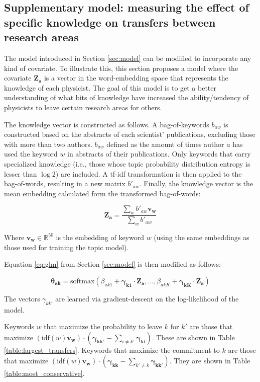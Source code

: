 \documentclass{article}
\begin{document}
\subsection{\label{appendix:knowledge}Supplementary model: measuring the effect of specific knowledge on transfers between research areas}

The model introduced in Section \ref{sec:model} can be modified to incorporate any kind of covariate. To illustrate this, this section proposes a model where the covariate $\bm{Z_a}$ is a vector in the word-embedding space that represents the knowledge of each physicist. The goal of this model is to get a better understanding of what bits of knowledge have increased the ability/tendency of physicists to leave certain research areas for others. 

The knowledge vector is constructed as follows. A bag-of-keywords $b_{aw}$ is constructed based on the abstracts of each scientist' publications, excluding those with more than two authors. $b_{aw}$ defined as the amount of times author $a$ has used the keyword $w$ in abstracts of their publications. Only keywords that carry specialized knowledge (i.e., those whose topic probability distribution entropy is lesser than $\log 2$) are included. A tf-idf transformation is then applied to the bag-of-words, resulting in a new matrix $b'_{aw}$. Finally, the knowledge vector is the mean embedding calculated form the transformed bag-of-words:

\begin{equation}
    \bm{Z_{a}} = \dfrac{\sum_w b'_{aw} \bm{v_{w}}}{\sum_w b'_{aw}} 
\end{equation}

Where $\bm{v_w}\in\mathbb{R}^{50}$ is the embedding of keyword $w$ (using the same embeddings as those used for training the topic model). 

Equation \eqref{eq:glm} from Section \ref{sec:model} is then modified as follows:

\begin{equation}
    \bm{\theta_{ak}} = \text{softmax}\left(\beta_{ak1} + \bm{\gamma_{k1}}\cdot \bm{Z_{a}}, \dots,\beta_{akK} +  \bm{\gamma_{kK}}\cdot \bm{Z_{a}} \right)
\end{equation}

The vectors $\gamma_{kk'}$ are learned via gradient-descent on the log-likelihood of the model.

Keywords $w$ that maximize the probability to leave $k$ for $k'$ are those that maximize $(\text{idf}(w) \bm{v_w}) \cdot (\bm{\gamma_{kk'}}-\sum_{i \neq k'}\bm{\gamma_{ki}})$. These are shown in Table \ref{table:largest_transfers}.
Keywords that maximize the commitment to $k$ are those that maximize $ (\text{idf}(w) \bm{v_w}) \cdot (\bm{\gamma_{kk}}-\sum_{k' \neq k}\bm{\gamma_{kk'}})$. They are shown in Table \ref{table:most_conservative}.

\fontsize{6}{7}\selectfont\normalsize
\fontsize{6}{7}\selectfont\normalsize




\end{document}
